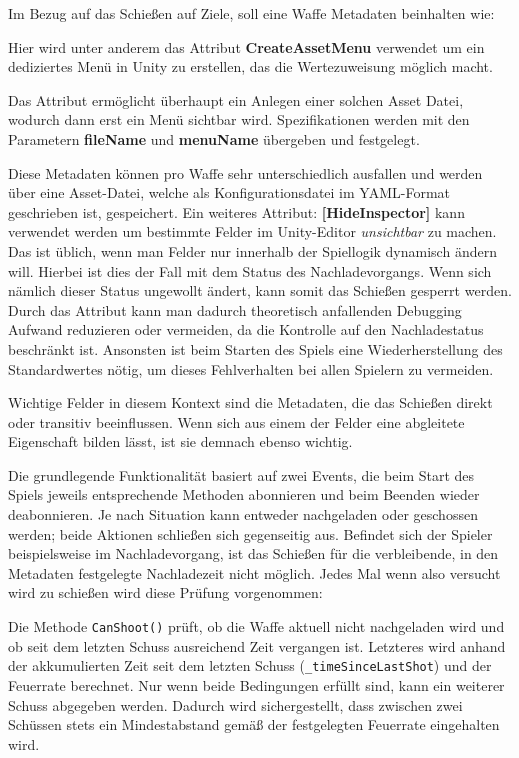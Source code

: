 Im Bezug auf das Schießen auf Ziele, soll eine Waffe Metadaten beinhalten wie: 

Hier wird unter anderem das Attribut \textbf{CreateAssetMenu} verwendet um ein dediziertes Menü in Unity zu erstellen, das die Wertezuweisung möglich macht. 

Das Attribut ermöglicht überhaupt ein Anlegen einer solchen Asset Datei, wodurch dann erst ein Menü sichtbar wird. Spezifikationen werden mit den Parametern \textbf{fileName} und \textbf{menuName} übergeben und festgelegt.

Diese Metadaten können pro Waffe sehr unterschiedlich ausfallen und werden über eine Asset-Datei, welche als Konfigurationsdatei im YAML-Format geschrieben ist, gespeichert. 
Ein weiteres Attribut: \textbf{[HideInspector]} kann verwendet werden um bestimmte Felder im Unity-Editor \textit{unsichtbar} zu machen. Das ist üblich, wenn man Felder nur innerhalb der Spiellogik dynamisch ändern will. Hierbei ist dies der Fall mit dem Status des Nachladevorgangs. 
Wenn sich nämlich dieser Status ungewollt ändert, kann somit das Schießen gesperrt werden. Durch das Attribut kann man dadurch theoretisch anfallenden Debugging Aufwand reduzieren oder vermeiden, da die Kontrolle auf den Nachladestatus beschränkt ist. Ansonsten ist beim Starten des Spiels eine Wiederherstellung des Standardwertes nötig, um dieses Fehlverhalten bei allen Spielern zu vermeiden.

Wichtige Felder in diesem Kontext sind die Metadaten, die das Schießen direkt oder transitiv beeinflussen. Wenn sich aus einem der Felder eine abgleitete Eigenschaft bilden lässt, ist sie demnach ebenso wichtig.

Die grundlegende Funktionalität basiert auf zwei Events, die beim Start des Spiels jeweils entsprechende Methoden abonnieren und beim Beenden wieder deabonnieren. Je nach Situation kann entweder nachgeladen oder geschossen werden; beide Aktionen schließen sich gegenseitig aus. Befindet sich der Spieler beispielsweise im Nachladevorgang, ist das Schießen für die verbleibende, in den Metadaten festgelegte Nachladezeit nicht möglich.
\newpage
Jedes Mal wenn also versucht wird zu schießen wird diese Prüfung vorgenommen:

Die Methode \texttt{CanShoot()} prüft, ob die Waffe aktuell nicht nachgeladen wird und ob seit dem letzten Schuss ausreichend Zeit vergangen ist. Letzteres wird anhand der akkumulierten Zeit seit dem letzten Schuss (\texttt{\_timeSinceLastShot}) und der Feuerrate berechnet. Nur wenn beide Bedingungen erfüllt sind, kann ein weiterer Schuss abgegeben werden. Dadurch wird sichergestellt, dass zwischen zwei Schüssen stets ein Mindestabstand gemäß der festgelegten Feuerrate eingehalten wird.


